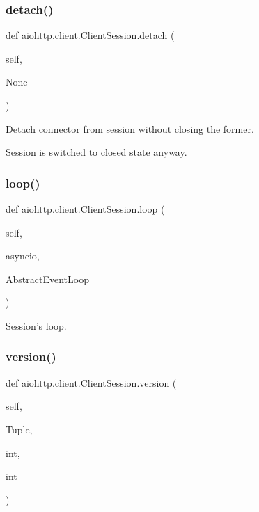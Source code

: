 \subsubsection{\texorpdfstring{detach()}{detach()}}
{\footnotesize\ttfamily def aiohttp.\+client.\+Client\+Session.\+detach (\begin{DoxyParamCaption}\item[{}]{self,  }\item[{}]{None }\end{DoxyParamCaption})}

\begin{DoxyVerb}Detach connector from session without closing the former.

Session is switched to closed state anyway.
\end{DoxyVerb}
 \mbox{\label{classaiohttp_1_1client_1_1_client_session_addc1e7d257a7abfd78eef10b9c7f4fb6}} 
\subsubsection{\texorpdfstring{loop()}{loop()}}
{\footnotesize\ttfamily def aiohttp.\+client.\+Client\+Session.\+loop (\begin{DoxyParamCaption}\item[{}]{self,  }\item[{}]{asyncio,  }\item[{}]{Abstract\+Event\+Loop }\end{DoxyParamCaption})}

\begin{DoxyVerb}Session's loop.\end{DoxyVerb}
 \mbox{\label{classaiohttp_1_1client_1_1_client_session_a5f6ab7a25c8e88005e78477f0f1b572b}} 
\subsubsection{\texorpdfstring{version()}{version()}}
{\footnotesize\ttfamily def aiohttp.\+client.\+Client\+Session.\+version (\begin{DoxyParamCaption}\item[{}]{self,  }\item[{}]{Tuple,  }\item[{}]{int,  }\item[{}]{int }\end{DoxyParamCaption})}


